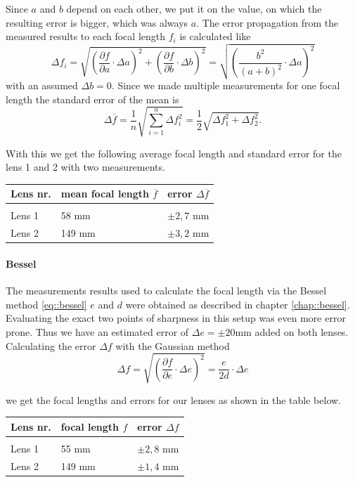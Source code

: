 Since $a$ and $b$ depend on each other, we put it on the value, on which the resulting error is bigger, which was always $a$.
The error propagation from the measured results to each focal length $f_i$ is calculated like
\[
  \displaystyle	\Delta f_i = \sqrt{\left(\frac{\partial f}{\partial a} \cdot \Delta a \right)^2 +\left(\frac{\partial f}{\partial b} \cdot \Delta b\right)^2 } = \sqrt{\left(\frac{b^2}{(a+b)^2}\cdot \Delta a\right)^2}
\]
with an assumed $\Delta b = 0$. 
Since we made multiple measurements for one focal length the standard error of the mean is
\[
\displaystyle	\Delta \overline{f} =\frac{1}{n} \sqrt{\sum_{i=1}^{n}\Delta f_i^2} = \frac{1}{2}\sqrt{\Delta f_1^2 + \Delta f_2^2 }.
\label{eq::mean}
\]

With this we get the following average focal length and standard error for the lens 1 and 2 with two measurements.

	\begin{tabularx}{\textwidth}{XM{5cm}M{5cm}}%
		\toprule 
		Lens nr.& mean focal length $\overline{f}$ & error $\Delta \overline{f}$\\
		\hline
		&&\\[-5pt]
		Lens 1	& 58 \si{\milli \m} & $\pm 2,7$ \si{\milli \m}	\\
		Lens 2	& 149 \si{\milli \m} & $\pm 3,2$ \si{\milli \m}	\\
		

		\bottomrule 
	\end{tabularx}

\paragraph{Bessel}
The measurements results used to calculate the focal length via the Bessel method \ref{eq::bessel} $e$ and $d$ were obtained as described in chapter \ref{chap::bessel}.
Evaluating the exact two points of sharpness in this setup was even more error prone.
Thus we have an estimated error of $\Delta e= \pm 20$\si{\milli\m} added on both lenses.
Calculating the error $\Delta f$ with the Gaussian method
\[
\displaystyle	\Delta f = \sqrt{\left(\frac{\partial f}{\partial e} \cdot \Delta e \right)^2 } = \frac{e}{2d}\cdot \Delta e
\]

we get the focal lengths and errors for our lenses as shown in the table below.

\begin{tabularx}{\textwidth}{XM{5cm}M{5cm}}%
	\toprule 
	Lens nr.&focal length $f$ & error $\Delta f$\\
	\hline
	&&\\[-5pt]
	Lens 1	& 55 \si{\milli \m} & $\pm 2,8$ \si{\milli \m}	\\
	Lens 2	& 149 \si{\milli \m} & $\pm 1,4$ \si{\milli \m}	\\	
	\bottomrule 
\end{tabularx}

